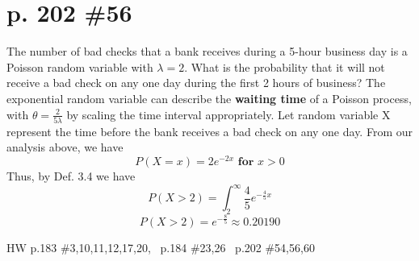 \documentclass[12pt]{article}
\begin{document}
	\section[20pt]{p. 202 \#56}
	The number of bad checks that a bank receives during a 5-hour business day is a Poisson random variable with \(\lambda=2\). What is the probability that it will not receive a bad check on any one day during the first 2 hours of business? \newline \newline
	The exponential random variable can describe the \textbf{waiting time} of a Poisson process, with \(\theta=\frac{2}{5\lambda}\) by scaling the time interval appropriately. \newline \newline
	Let random variable X represent the time before the bank receives a bad check on any one day. From our analysis above, we have
	\[P(X=x)=2e^{-2x} \textbf{ for }x>0\]
	Thus, by Def. 3.4 we have
	\[P(X>2)=\int_2^{\infty}\frac{4}{5}e^{-\frac{4}{5}x}\]
	\[P(X>2)=e^{-\frac{8}{5}}\approx0.20190\]
	\newpage
	\maketitle HW p.183 \#3,10,11,12,17,20, \ p.184 \#23,26 \ p.202 \#54,56,60
\end{document}
